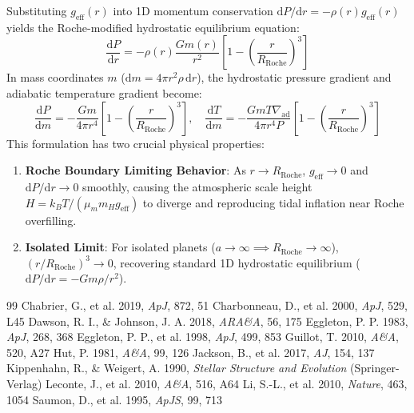 \documentclass[twocolumn,10pt]{article}
\begin{document}
Substituting $g_{\text{eff}}(r)$ into 1D momentum conservation $\mathrm{d}P/\mathrm{d}r = -\rho(r) g_{\text{eff}}(r)$ yields the Roche-modified hydrostatic equilibrium equation:
\begin{equation}
\frac{\mathrm{d}P}{\mathrm{d}r} = -\rho(r) \frac{G m(r)}{r^2} \left[ 1 - \left(\frac{r}{R_{\text{Roche}}}\right)^3 \right]
\end{equation}
In mass coordinates $m$ ($\mathrm{d}m = 4\pi r^2 \rho \, \mathrm{d}r$), the hydrostatic pressure gradient and adiabatic temperature gradient become:
\begin{equation}
\frac{\mathrm{d}P}{\mathrm{d}m} = -\frac{G m}{4\pi r^4} \left[ 1 - \left(\frac{r}{R_{\text{Roche}}}\right)^3 \right], \quad \frac{\mathrm{d}T}{\mathrm{d}m} = -\frac{G m T \nabla_{\text{ad}}}{4\pi r^4 P} \left[ 1 - \left(\frac{r}{R_{\text{Roche}}}\right)^3 \right]
\end{equation}
This formulation has two crucial physical properties:
\begin{enumerate}
    \item \textbf{Roche Boundary Limiting Behavior}: As $r \to R_{\text{Roche}}$, $g_{\text{eff}} \to 0$ and $\mathrm{d}P/\mathrm{d}r \to 0$ smoothly, causing the atmospheric scale height $H = k_B T / (\mu_m m_H g_{\text{eff}})$ to diverge and reproducing tidal inflation near Roche overfilling.
    \item \textbf{Isolated Limit}: For isolated planets ($a \to \infty \implies R_{\text{Roche}} \to \infty$), $(r/R_{\text{Roche}})^3 \to 0$, recovering standard 1D hydrostatic equilibrium ($\mathrm{d}P/\mathrm{d}r = -G m \rho / r^2$).
\end{enumerate}

\begin{thebibliography}{99}
 Chabrier, G., et al. 2019, \textit{ApJ}, 872, 51
 Charbonneau, D., et al. 2000, \textit{ApJ}, 529, L45
 Dawson, R. I., \& Johnson, J. A. 2018, \textit{ARA\&A}, 56, 175
 Eggleton, P. P. 1983, \textit{ApJ}, 268, 368
 Eggleton, P. P., et al. 1998, \textit{ApJ}, 499, 853
 Guillot, T. 2010, \textit{A\&A}, 520, A27
 Hut, P. 1981, \textit{A\&A}, 99, 126
 Jackson, B., et al. 2017, \textit{AJ}, 154, 137
 Kippenhahn, R., \& Weigert, A. 1990, \textit{Stellar Structure and Evolution} (Springer-Verlag)
 Leconte, J., et al. 2010, \textit{A\&A}, 516, A64
 Li, S.-L., et al. 2010, \textit{Nature}, 463, 1054
 Saumon, D., et al. 1995, \textit{ApJS}, 99, 713
\end{thebibliography}
\end{document}
